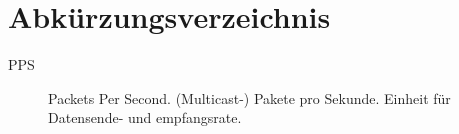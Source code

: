 \chapter*{Abkürzungsverzeichnis}

    \begin{description}
        \item[PPS] Packets Per Second. (Multicast-) Pakete pro Sekunde. Einheit
        für Datensende- und empfangsrate.
    \end{description}